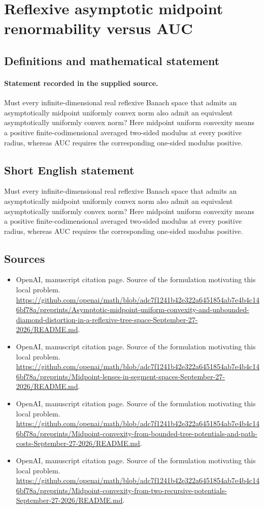 \documentclass[11pt]{article}
\begin{document}
\section*{Reflexive asymptotic midpoint renormability versus AUC}\label{30007183}
\subsection{Definitions and mathematical statement}
\paragraph{Statement recorded in the supplied source.}
Must every infinite-dimensional real reflexive Banach space that admits an asymptotically midpoint uniformly convex norm also admit an equivalent asymptotically uniformly convex norm? Here midpoint uniform convexity means a positive finite-codimensional averaged two-sided modulus at every positive radius, whereas AUC requires the corresponding one-sided modulus positive.
\subsection{Short English statement}
Must every infinite-dimensional real reflexive Banach space that admits an asymptotically midpoint uniformly convex norm also admit an equivalent asymptotically uniformly convex norm? Here midpoint uniform convexity means a positive finite-codimensional averaged two-sided modulus at every positive radius, whereas AUC requires the corresponding one-sided modulus positive.
\subsection{Sources}
\begin{itemize}
\item[S1] OpenAI, manuscript citation page. Source of the formulation motivating this local problem.
\url{https://github.com/openai/math/blob/adc7f1241b42e322a6451854ab7e4b4c146bf78a/preprints/Asymptotic-midpoint-uniform-convexity-and-unbounded-diamond-distortion-in-a-reflexive-tree-space-September-27-2026/README.md}.
\item[S2] OpenAI, manuscript citation page. Source of the formulation motivating this local problem.
\url{https://github.com/openai/math/blob/adc7f1241b42e322a6451854ab7e4b4c146bf78a/preprints/Midpoint-lenses-in-segment-spaces-September-27-2026/README.md}.
\item[S3] OpenAI, manuscript citation page. Source of the formulation motivating this local problem.
\url{https://github.com/openai/math/blob/adc7f1241b42e322a6451854ab7e4b4c146bf78a/preprints/Midpoint-convexity-from-bounded-tree-potentials-and-path-costs-September-27-2026/README.md}.
\item[S4] OpenAI, manuscript citation page. Source of the formulation motivating this local problem.
\url{https://github.com/openai/math/blob/adc7f1241b42e322a6451854ab7e4b4c146bf78a/preprints/Midpoint-convexity-from-two-recursive-potentials-September-27-2026/README.md}.
\end{itemize}
\end{document}
